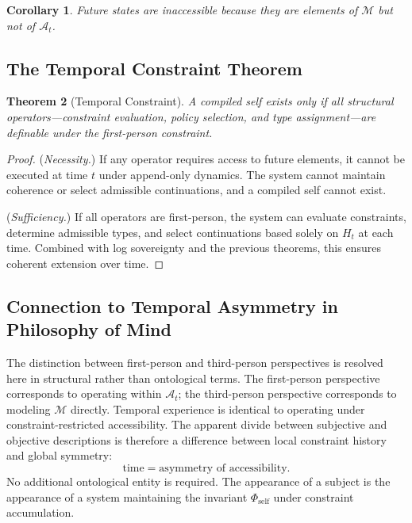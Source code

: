 \documentclass[12pt, a4paper]{article}
\theoremstyle{plain}
\newtheorem{theorem}{Theorem}[section]
\newtheorem{corollary}[theorem]{Corollary}
\theoremstyle{definition}
\theoremstyle{remark}
\begin{document}
\begin{corollary}
Future states are inaccessible because they are elements of $\mathcal{M}$ but not of $\mathcal{A}_t$.
\end{corollary}

\subsection{The Temporal Constraint Theorem}

\begin{theorem}[Temporal Constraint]
A compiled self exists only if all structural operators---constraint evaluation, policy selection, and type assignment---are definable under the first-person constraint.
\end{theorem}

\begin{proof}
(\textit{Necessity.}) If any operator requires access to future elements, it cannot be executed at time $t$ under append-only dynamics. The system cannot maintain coherence or select admissible continuations, and a compiled self cannot exist.

(\textit{Sufficiency.}) If all operators are first-person, the system can evaluate constraints, determine admissible types, and select continuations based solely on $H_t$ at each time. Combined with log sovereignty and the previous theorems, this ensures coherent extension over time.
\end{proof}

\subsection{Connection to Temporal Asymmetry in Philosophy of Mind}

The distinction between first-person and third-person perspectives is resolved here in structural rather than ontological terms. The first-person perspective corresponds to operating within $\mathcal{A}_t$; the third-person perspective corresponds to modeling $\mathcal{M}$ directly. Temporal experience is identical to operating under constraint-restricted accessibility. The apparent divide between subjective and objective descriptions is therefore a difference between local constraint history and global symmetry:
\[
\text{time} = \text{asymmetry of accessibility}.
\]
No additional ontological entity is required. The appearance of a subject is the appearance of a system maintaining the invariant $\Phi_{\mathrm{self}}$ under constraint accumulation.
\end{document}
